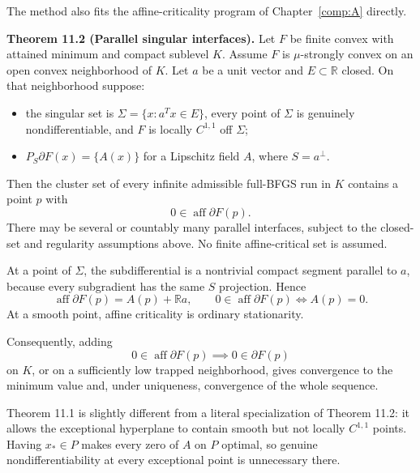 The method also fits the affine-criticality program of Chapter~\ref{comp:A} directly.

\label{U:parallel}\textbf{Theorem 11.2 (Parallel singular interfaces).} Let \(F\) be finite
convex with attained minimum and compact sublevel \(K\). Assume \(F\) is
\(\mu\)-strongly convex on an open convex neighborhood of \(K\). Let
\(a\) be a unit vector and \(E\subset\mathbb R\) closed. On that
neighborhood suppose:

\begin{itemize}
\tightlist
\item
  the singular set is \(\Sigma=\{x:a^Tx\in E\}\), every point of
  \(\Sigma\) is genuinely nondifferentiable, and \(F\) is locally
  \(C^{1,1}\) off \(\Sigma\);
\item
  \(P_S\partial F(x)=\{A(x)\}\) for a Lipschitz field \(A\), where
  \(S=a^\perp\).
\end{itemize}

Then the cluster set of every infinite admissible full-BFGS run in \(K\)
contains a point \(p\) with \[
 \boxed{0\in\operatorname{aff}\partial F(p).}
\] There may be several or countably many parallel interfaces, subject
to the closed-set and regularity assumptions above. No finite
affine-critical set is assumed.

At a point of \(\Sigma\), the subdifferential is a nontrivial compact
segment parallel to \(a\), because every subgradient has the same \(S\)
projection. Hence \[
 \operatorname{aff}\partial F(p)=A(p)+\mathbb R a,
 \qquad
 0\in\operatorname{aff}\partial F(p)\iff A(p)=0.
\] At a smooth point, affine criticality is ordinary stationarity.

Consequently, adding \[
 0\in\operatorname{aff}\partial F(p)\implies0\in\partial F(p)
\] on \(K\), or on a sufficiently low trapped neighborhood, gives
convergence to the minimum value and, under uniqueness, convergence of
the whole sequence.

Theorem 11.1 is slightly different from a literal specialization of Theorem 11.2: it allows the exceptional hyperplane to contain smooth but not
locally \(C^{1,1}\) points. Having \(x_*\in P\) makes every zero of
\(A\) on \(P\) optimal, so genuine nondifferentiability at every
exceptional point is unnecessary there.


\setcounter{section}{4}
\setcounter{theorem}{0}
\setcounter{lemma}{0}
\setcounter{corollary}{0}
\setcounter{proposition}{0}
\setcounter{remark}{0}
\setcounter{equation}{0}


